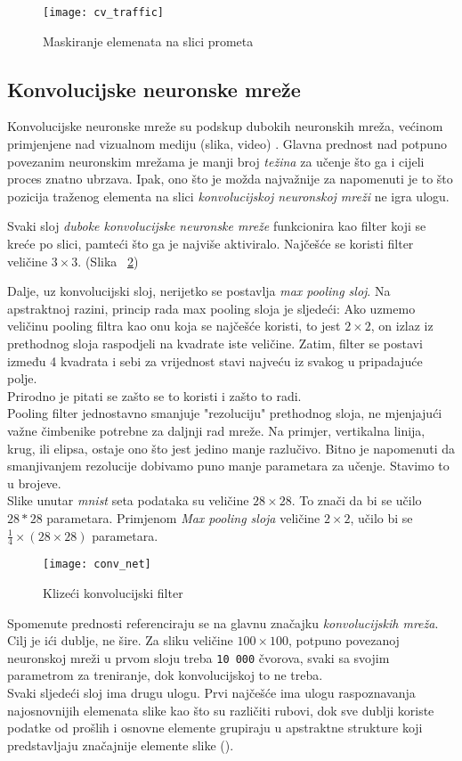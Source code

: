 \begin{figure}[h!]
	\centering
	\texttt{[image: cv\_traffic]}
	 \caption{Maskiranje elemenata na slici prometa}
 	 \label{fig:cv_traffic_1}
\end{figure}

\subsection{Konvolucijske neuronske mreže}
Konvolucijske neuronske mreže su podskup dubokih neuronskih mreža, većinom primjenjene nad vizualnom mediju (slika, video) \cite{ConvNet}.
Glavna prednost nad potpuno povezanim neuronskim mrežama je manji broj \emph{težina} za učenje što ga i cijeli proces znatno ubrzava. 
Ipak, ono što je možda najvažnije za napomenuti je to što pozicija traženog elementa na slici \emph{konvolucijskoj neuronskoj mreži} ne igra ulogu. 

Svaki sloj \emph{duboke konvolucijske neuronske mreže} funkcionira kao filter koji se kreće po slici, pamteći što ga je najviše aktiviralo. Najčešće se koristi filter veličine $3\times3$.
(Slika ~\ref{fig:conv_net_1})

Dalje, uz konvolucijski sloj, nerijetko se postavlja \emph{max pooling sloj}.
Na apstraktnoj razini, princip rada max pooling sloja je sljedeći: Ako uzmemo veličinu pooling filtra kao onu koja se najčešće koristi, to jest $2\times2$, on izlaz iz prethodnog sloja raspodjeli na kvadrate iste veličine. Zatim, filter se postavi između 4 kvadrata i sebi za vrijednost stavi najveću iz svakog u pripadajuće polje. \\ 
Prirodno je pitati se zašto se to koristi i zašto to radi. \\
Pooling filter jednostavno smanjuje "rezoluciju" prethodnog sloja, ne mjenjajući važne čimbenike potrebne za daljnji rad mreže. 
Na primjer, vertikalna linija, krug, ili elipsa, ostaje ono što jest jedino manje razlučivo. 
Bitno je napomenuti da smanjivanjem rezolucije dobivamo puno manje parametara za učenje. 
Stavimo to u brojeve. \\
Slike unutar \emph{mnist} seta podataka su veličine $28\times28$.
To znači da bi se učilo $28*28$ parametara. 
Primjenom \emph{Max pooling sloja} veličine $2\times2$, učilo bi se $\frac{1}{4}\times(28\times28)$ parametara. 

\begin{figure}[h!]
	\centering
	\texttt{[image: conv\_net]}
	 \caption{Klizeći konvolucijski filter}
 	 \label{fig:conv_net_1}
\end{figure}

Spomenute prednosti referenciraju se na glavnu značajku \emph{konvolucijskih mreža}. 
Cilj je ići dublje, ne šire. 
Za sliku veličine $100\times100$, potpuno povezanoj neuronskoj mreži u prvom sloju treba \texttt{10 000} čvorova, svaki sa svojim parametrom za treniranje, dok konvolucijskoj to ne treba. \\
Svaki sljedeći sloj ima drugu ulogu. 
Prvi najčešće ima ulogu raspoznavanja najosnovnijih elemenata slike kao što su različiti rubovi, dok sve dublji koriste podatke od prošlih i osnovne elemente grupiraju u apstraktne strukture koji predstavljaju značajnije elemente slike (\cite{o2015introduction}).
